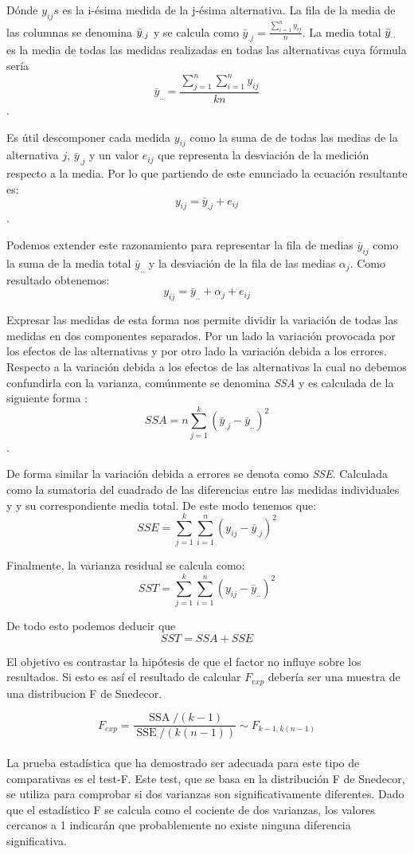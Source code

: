 Dónde $y_{ij}s$ es la i-ésima medida de la j-ésima alternativa. La fila de la media de las columnas se denomina $\Bar{y}_{.j}$ y se calcula como $
\bar{y}_{. j}=\frac{\sum_{i=1}^{n} y_{i j}}{n}
$. La media total $\Bar{y}_{..}$ es la media de todas las medidas realizadas en todas las alternativas cuya fórmula sería $$
\bar{y}_{. .}=\frac{\sum_{j=1}^{n} \sum_{i=1}^{n} y_{i j}}{k n}
$$.

Es útil descomponer cada medida $y_{ij}$ como la suma de de todas las medias de la alternativa $j$, $\bar{y}_{.j}$ y un valor $e_{ij}$ que representa la desviación de la medición respecto a la media. Por lo que partiendo de este enunciado la ecuación resultante es: $$y_{ij}=\bar{y}_{.j} + e_{ij}$$.

Podemos extender este razonamiento para representar la fila de medias $\bar{y}_{ij}$ como la suma de la  media total $\bar{y}_{..}$ y la desviación de la fila de las medias $\alpha_j$. Como resultado obtenemos: $$
y_{i j}=\bar{y}_{. .}+\alpha_{j}+e_{i j}
$$

Expresar las medidas de esta forma nos permite dividir la variación de todas las medidas en dos componentes separados. Por un lado la variación provocada por los efectos de las alternativas y por otro lado la variación debida a los errores. Respecto a la variación debida a los efectos de las alternativas la cual no debemos confundirla con la varianza, comúnmente se denomina \textit{SSA} y es calculada de la siguiente forma :  $$S S A=n \sum_{j=1}^{k}\left(\bar{y}_{. j}-\bar{y}_{. .}\right)^{2}$$. 

De forma similar la variación debida a errores se denota como \textit{SSE}. Calculada como la sumatoria del cuadrado de las diferencias entre las medidas individuales y y su correspondiente media total. De este modo tenemos que:  $$S S E=\sum_{j=1}^{k} \sum_{i=1}^{n}\left(y_{i j}-\bar{y}_{. j}\right)^{2}$$ 

Finalmente, la varianza residual se calcula como:
$$
S S T=\sum_{j=1}^{k} \sum_{i=1}^{n}\left(y_{i j}-\bar{y}_{..}\right)^{2}
$$

De todo esto podemos deducir que $$S S T= S S A + S S E$$

El objetivo es contrastar la hipótesis de que el factor no influye sobre los resultados. Si esto es así el resultado de calcular $F_{exp}$ debería ser una muestra de una distribucion F de Snedecor.

$$
F_{e x p} = \frac{\operatorname{SSA} /\left(k-1\right)}{\operatorname{SSE} /\left (k(n-1)\right) } \sim F_{k-1,k(n-1)}
$$
\\
La prueba estadística que ha demostrado ser adecuada para este tipo de comparativas es el test-F. Este test, que se basa en la distribución F de Snedecor, se utiliza para comprobar si dos varianzas son significativamente diferentes. Dado que el estadístico F se calcula como el cociente de dos varianzas, los valores cercanos a 1 indicarán que probablemente no existe ninguna diferencia significativa.\\

